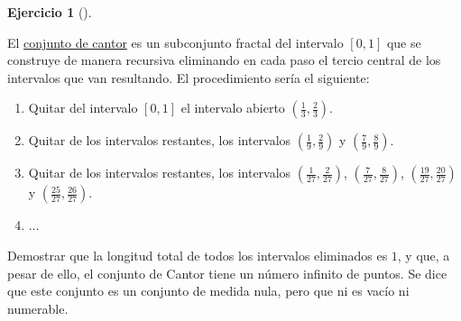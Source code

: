 \documentclass[
  spanish,
  a4paper,
]{scrreport}
\providecommand{\tightlist}{%
  \setlength{\itemsep}{0pt}\setlength{\parskip}{0pt}}
\theoremstyle{definition}
\newtheorem{exercise}{Ejercicio}[chapter]
\theoremstyle{remark}
\begin{document}
\begin{exercise}[]\protect\hypertarget{exr-serie-conjunto-cantor}{}\label{exr-serie-conjunto-cantor}

El \href{https://es.wikipedia.org/wiki/Conjunto_de_Cantor}{conjunto de
cantor} es un subconjunto fractal del intervalo \([0,1]\) que se
construye de manera recursiva eliminando en cada paso el tercio central
de los intervalos que van resultando. El procedimiento sería el
siguiente:

\begin{enumerate}
\def\labelenumi{\arabic{enumi}.}
\tightlist
\item
  Quitar del intervalo \([0,1]\) el intervalo abierto
  \(\left(\frac{1}{3},\frac{2}{3}\right)\).
\item
  Quitar de los intervalos restantes, los intervalos
  \(\left(\frac{1}{9},\frac{2}{9}\right)\) y
  \(\left(\frac{7}{9},\frac{8}{9}\right)\).
\item
  Quitar de los intervalos restantes, los intervalos
  \(\left(\frac{1}{27},\frac{2}{27}\right)\),
  \(\left(\frac{7}{27},\frac{8}{27}\right)\),
  \(\left(\frac{19}{27},\frac{20}{27}\right)\) y
  \(\left(\frac{25}{27},\frac{26}{27}\right)\).
\item
  \(\ldots\)
\end{enumerate}

Demostrar que la longitud total de todos los intervalos eliminados es
\(1\), y que, a pesar de ello, el conjunto de Cantor tiene un número
infinito de puntos. Se dice que este conjunto es un conjunto de medida
nula, pero que ni es vacío ni numerable.

\end{exercise}
\end{document}
